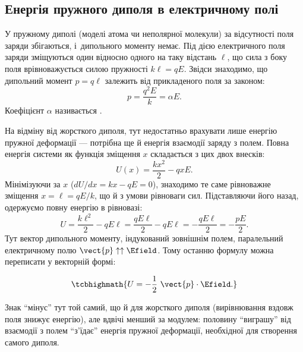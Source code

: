 \subsection*{Енергія пружного диполя в електричному полі}

У пружному диполі (моделі атома чи неполярної молекули) за відсутності поля заряди
збігаються, і~дипольного моменту немає. Під дією електричного поля заряди зміщуються один
відносно одного на таку відстань $\ell$, що сила з боку поля врівноважується силою пружності
$
	k\ell = qE
$.
Звідси знаходимо, що дипольний момент $p = q\ell$ залежить від прикладеного поля за законом:
\begin{equation*}
	p = \frac{q^2E}{k} = \alpha E.
\end{equation*}
Коефіцієнт $\alpha$ називається .


На відміну від жорсткого диполя, тут недостатньо врахувати лише енергію пружної деформації --- потрібна ще й енергія взаємодії заряду з полем. Повна
енергія системи як функція зміщення $x$ складається з цих двох внесків:
\begin{equation*}
	U(x) = \frac{kx^2}2 - qxE.
\end{equation*}
Мінімізуючи за $x$ ($dU/dx = kx - qE = 0$), знаходимо те саме рівноважне зміщення $x=\ell=qE/k$, що й з умови рівноваги сил. Підставляючи його назад,
одержуємо повну енергію в рівновазі:
\begin{equation*}
	U = \frac{k\ell^2}2 - qE\ell = \frac{qE\ell}2 - qE\ell = -\frac{qE\ell}2 = -\frac{pE}2.
\end{equation*}
Тут вектор дипольного моменту, індукований зовнішнім полем, паралельний електричному полю
$\vect{p}\uparrow\uparrow \Efield$. Тому останню формулу можна переписати у векторній формі:

\begin{equation}
	\tcbhighmath{
		U = -\frac12\ \vect{p}\cdot\Efield.
	}
\end{equation}

Знак \enquote{мінус} тут той самий, що й для жорсткого диполя (вирівнювання вздовж поля знижує енергію), але вдвічі менший за модулем: половину
\enquote{виграшу} від взаємодії з полем \enquote{з'їдає} енергія пружної деформації, необхідної для створення самого диполя.


